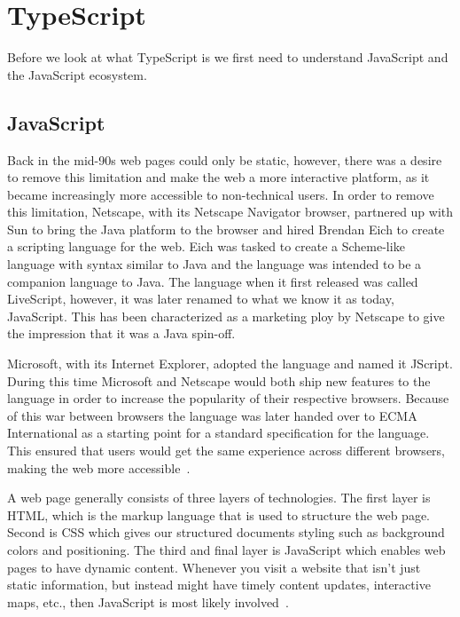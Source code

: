 
\section{TypeScript}\label{sec:typescript}

Before we look at what TypeScript is we first need to understand JavaScript and the JavaScript ecosystem.

\subsection{JavaScript}\label{subsec:javascript}

Back in the mid-90s web pages could only be static, however, there was a desire to remove this limitation and make the web a more interactive platform, as it became increasingly more accessible to non-technical users.
In order to remove this limitation, Netscape, with its Netscape Navigator browser, partnered up with Sun to bring the Java platform to the browser and hired Brendan Eich to create a scripting language for the web.
Eich was tasked to create a Scheme-like language with syntax similar to Java and the language was intended to be a companion language to Java.
The language when it first released was called LiveScript, however, it was later renamed to what we know it as today, JavaScript.
This has been characterized as a marketing ploy by Netscape to give the impression that it was a Java spin-off.

Microsoft, with its Internet Explorer, adopted the language and named it JScript.
During this time Microsoft and Netscape would both ship new features to the language in order to increase the popularity of their respective browsers.
Because of this war between browsers the language was later handed over to ECMA International as a starting point for a standard specification for the language.
This ensured that users would get the same experience across different browsers, making the web more accessible~\cite{jswikipedia}.

A web page generally consists of three layers of technologies.
The first layer is HTML, which is the markup language that is used to structure the web page.
Second is CSS which gives our structured documents styling such as background colors and positioning.
The third and final layer is JavaScript which enables web pages to have dynamic content.
Whenever you visit a website that isn't just static information, but instead might have timely content updates, interactive maps, etc., then JavaScript is most likely involved~\cite{whatisjs}.

